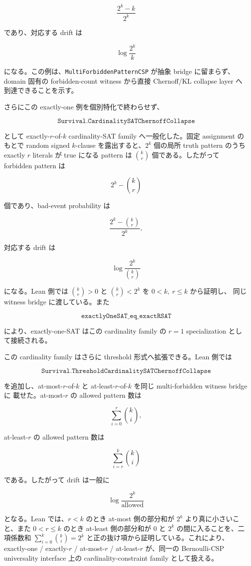 \documentclass[12pt,a4paper]{article}
\begin{document}
\[
\frac{2^k-k}{2^k}
\]

であり、対応する drift は

\[
\log\frac{2^k}{k}
\]

になる。この例は、\texttt{MultiForbiddenPatternCSP} が抽象 bridge に留まらず、domain 固有の forbidden-count witness から直接 Chernoff/KL collapse layer へ到達できることを示す。

さらにこの exactly-one 例を個別特化で終わらせず、

\[
\texttt{Survival.CardinalitySATChernoffCollapse}
\]

として exactly-\(r\)-of-\(k\) cardinality-SAT family へ一般化した。固定 assignment のもとで random signed \(k\)-clause を露出すると、\(2^k\) 個の局所 truth pattern のうち exactly \(r\) literals が true になる pattern は \(\binom{k}{r}\) 個である。したがって forbidden pattern は

\[
2^k-\binom{k}{r}
\]

個であり、bad-event probability は

\[
\frac{2^k-\binom{k}{r}}{2^k},
\]

対応する drift は

\[
\log\frac{2^k}{\binom{k}{r}}
\]

になる。Lean 側では \(\binom{k}{r}>0\) と \(\binom{k}{r}<2^k\) を \(0<k,\ r\le k\) から証明し、 同じ witness bridge に渡している。また

\[
\texttt{exactlyOneSAT\_eq\_exactRSAT}
\]

により、exactly-one-SAT はこの cardinality family の \(r=1\) specialization として接続される。

この cardinality family はさらに threshold 形式へ拡張できる。Lean 側では

\[
\texttt{Survival.ThresholdCardinalitySATChernoffCollapse}
\]

を追加し、at-most-\(r\)-of-\(k\) と at-least-\(r\)-of-\(k\) を同じ multi-forbidden witness bridge に 載せた。at-most-\(r\) の allowed pattern 数は

\[
\sum_{i=0}^{r} \binom{k}{i},
\]

at-least-\(r\) の allowed pattern 数は

\[
\sum_{i=r}^{k} \binom{k}{i}
\]

である。したがって drift は一般に

\[
\log\frac{2^k}{\text{allowed}}
\]

となる。Lean では、\(r<k\) のとき at-most 側の部分和が \(2^k\) より真に小さいこと、また \(0<r\le k\) のとき at-least 側の部分和が \(0\) と \(2^k\) の間に入ることを、二項係数和 \(\sum_{i=0}^{k}\binom{k}{i}=2^k\) と正の抜け項から証明している。これにより、 exactly-one / exactly-\(r\) / at-most-\(r\) / at-least-\(r\) が、同一の Bernoulli-CSP universality interface 上の cardinality-constraint family として扱える。
\end{document}
